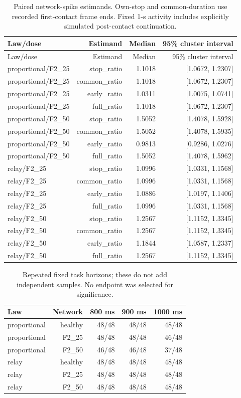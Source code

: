 \documentclass[10pt,letterpaper]{article}
\begin{document}
{\small
\begin{longtable}{lrrr}
\caption{Paired network-spike estimands. Own-stop and common-duration use recorded first-contact frame ends. Fixed 1-s activity includes explicitly simulated post-contact continuation.}\\
\toprule
Law/dose & Estimand & Median & 95\% cluster interval\\
\midrule\endfirsthead
\toprule
Law/dose & Estimand & Median & 95\% cluster interval\\
\midrule\endhead
proportional/F2\_25 & stop\_ratio & 1.1018 & [1.0672, 1.2307]\\
proportional/F2\_25 & common\_ratio & 1.1018 & [1.0672, 1.2307]\\
proportional/F2\_25 & early\_ratio & 1.0311 & [1.0075, 1.0741]\\
proportional/F2\_25 & full\_ratio & 1.1018 & [1.0672, 1.2307]\\
proportional/F2\_50 & stop\_ratio & 1.5052 & [1.4078, 1.5928]\\
proportional/F2\_50 & common\_ratio & 1.5052 & [1.4078, 1.5935]\\
proportional/F2\_50 & early\_ratio & 0.9813 & [0.9286, 1.0276]\\
proportional/F2\_50 & full\_ratio & 1.5052 & [1.4078, 1.5962]\\
relay/F2\_25 & stop\_ratio & 1.0996 & [1.0331, 1.1568]\\
relay/F2\_25 & common\_ratio & 1.0996 & [1.0331, 1.1568]\\
relay/F2\_25 & early\_ratio & 1.0886 & [1.0197, 1.1406]\\
relay/F2\_25 & full\_ratio & 1.0996 & [1.0331, 1.1568]\\
relay/F2\_50 & stop\_ratio & 1.2567 & [1.1152, 1.3345]\\
relay/F2\_50 & common\_ratio & 1.2567 & [1.1152, 1.3345]\\
relay/F2\_50 & early\_ratio & 1.1844 & [1.0587, 1.2337]\\
relay/F2\_50 & full\_ratio & 1.2567 & [1.1152, 1.3345]\\
\bottomrule
\end{longtable}
}

\begin{table}[H]
\centering\small
\caption{Repeated fixed task horizons; these do not add independent samples. No endpoint was selected for significance.}
\begin{tabular}{lrrrr}
\toprule
Law & Network & 800 ms & 900 ms & 1000 ms\\
\midrule
proportional & healthy & 48/48 & 48/48 & 48/48\\
proportional & F2\_25 & 48/48 & 48/48 & 46/48\\
proportional & F2\_50 & 46/48 & 46/48 & 37/48\\
relay & healthy & 48/48 & 48/48 & 48/48\\
relay & F2\_25 & 48/48 & 48/48 & 48/48\\
relay & F2\_50 & 48/48 & 48/48 & 48/48\\
\bottomrule
\end{tabular}
\end{table}
\end{document}

